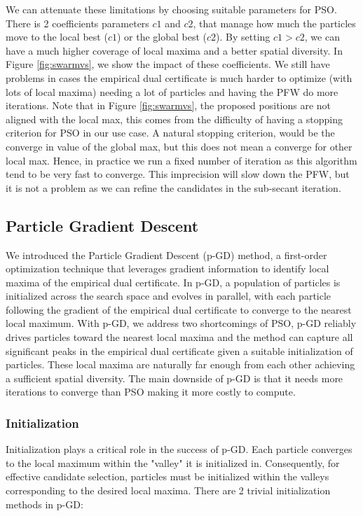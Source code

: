 \documentclass[a4paper,12pt,oneside]{report}
\theoremstyle{named}
\begin{document}
We can attenuate these limitations by choosing suitable parameters for PSO. There is 2 coefficients parameters $c1$ and $c2$, that manage how much the particles move to the local best ($c1$) or the global best ($c2$). By setting $c1 > c2$, we can have a much higher coverage of local maxima and a better spatial diversity. In Figure \ref{fig:swarmvs}, we show the impact of these coefficients. We still have problems in cases the empirical dual certificate is much harder to optimize (with lots of local maxima) needing a lot of particles and having the PFW do more iterations. Note that in Figure \ref{fig:swarmvs}, the proposed positions are not aligned with the local max, this comes from the difficulty of having a stopping criterion for PSO in our use case. A natural stopping criterion, would be the converge in value of the global max, but this does not mean a converge for other local max. Hence, in practice we run a fixed number of iteration as this algorithm tend to be very fast to converge. This imprecision will slow down the PFW, but it is not a problem as we can refine the candidates in the sub-secant iteration.

\subsection{Particle Gradient Descent}
We introduced the Particle Gradient Descent (p-GD) method, a first-order optimization technique that leverages gradient information to identify local maxima of the empirical dual certificate. In p-GD, a population of particles is initialized across the search space and evolves in parallel, with each particle following the gradient of the empirical dual certificate to converge to the nearest local maximum. With p-GD, we address two shortcomings of PSO, p-GD reliably drives particles toward the nearest local maxima and the method can capture all significant peaks in the empirical dual certificate given a suitable initialization of particles. These local maxima are naturally far enough from each other achieving a sufficient spatial diversity. The main downside of p-GD is that it needs more iterations to converge than PSO making it more costly to compute.

\subsubsection{Initialization}
Initialization plays a critical role in the success of p-GD. Each particle converges to the local maximum within the "valley" it is initialized in. Consequently, for effective candidate selection, particles must be initialized within the valleys corresponding to the desired local maxima. There are 2 trivial initialization methods in p-GD:
\end{document}
